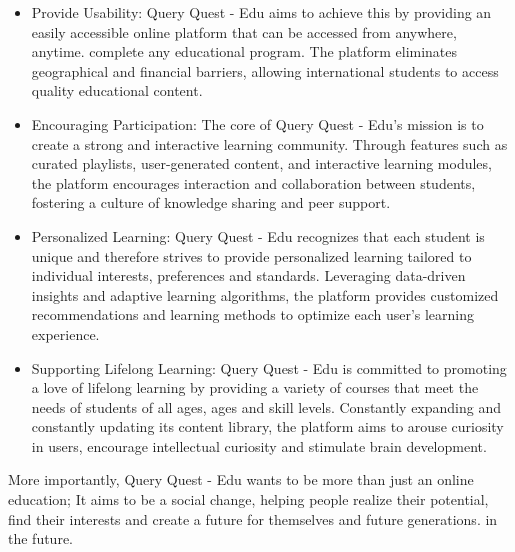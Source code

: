 \begin{itemize}
\item Provide Usability: Query Quest - Edu aims to achieve this by providing an easily accessible online platform that can be accessed from anywhere, anytime. complete any educational program. The platform eliminates geographical and financial barriers, allowing international students to access quality educational content.

\item Encouraging Participation: The core of Query Quest - Edu's mission is to create a strong and interactive learning community. Through features such as curated playlists, user-generated content, and interactive learning modules, the platform encourages interaction and collaboration between students, fostering a culture of knowledge sharing and peer support.

\item Personalized Learning: Query Quest - Edu recognizes that each student is unique and therefore strives to provide personalized learning tailored to individual interests, preferences and standards. Leveraging data-driven insights and adaptive learning algorithms, the platform provides customized recommendations and learning methods to optimize each user's learning experience.

\item Supporting Lifelong Learning: Query Quest - Edu is committed to promoting a love of lifelong learning by providing a variety of courses that meet the needs of students of all ages, ages and skill levels. Constantly expanding and constantly updating its content library, the platform aims to arouse curiosity in users, encourage intellectual curiosity and stimulate brain development.
\end{itemize} 
More importantly, Query Quest - Edu wants to be more than just an online education; It aims to be a social change, helping people realize their potential, find their interests and create a future for themselves and future generations. in the future.

\newpage


